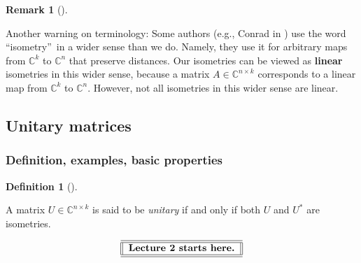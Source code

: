 \documentclass[numbers=enddot,12pt,final,onecolumn,notitlepage]{scrartcl}%
\numberwithin{exer}{subsection}
\theoremstyle{definition}
\newtheorem{defi}[theo]{Definition}
\newenvironment{definition}[1][]
{\begin{defi}[#1]\begin{leftbar}}
{\end{leftbar}\end{defi}}
\newtheorem{remk}[theo]{Remark}
\newenvironment{remark}[1][]
{\begin{remk}[#1]\begin{leftbar}}
{\end{leftbar}\end{remk}}
\begin{document}
\begin{remark}
Another warning on terminology: Some authors (e.g., Conrad in
\cite[\textquotedblleft Isometries\textquotedblright]{Conrad}) use the word
\textquotedblleft isometry\textquotedblright\ in a wider sense than we do.
Namely, they use it for arbitrary maps from $\mathbb{C}^{k}$ to $\mathbb{C}%
^{n}$ that preserve distances. Our isometries can be viewed as \textbf{linear}
isometries in this wider sense, because a matrix $A\in\mathbb{C}^{n\times k}$
corresponds to a linear map from $\mathbb{C}^{k}$ to $\mathbb{C}^{n}$.
However, not all isometries in this wider sense are linear.
\end{remark}

\subsection{Unitary matrices}

\subsubsection{Definition, examples, basic properties}

\begin{definition}
\label{def.unitary.unitary.unitary}A matrix $U\in\mathbb{C}^{n\times k}$ is
said to be \emph{unitary} if and only if both $U$ and $U^{\ast}$ are isometries.
\end{definition}

%

\[%
\begin{tabular}
[c]{||l||}\hline\hline
\textbf{Lecture 2 starts here.}\\\hline\hline
\end{tabular}
\]
\end{document}
